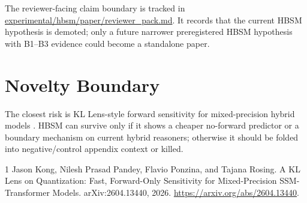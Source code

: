 \documentclass{article}
\begin{document}
The reviewer-facing claim boundary is tracked in
\url{experimental/hbsm/paper/reviewer_pack.md}. It records that the current HBSM hypothesis is demoted; only a future narrower preregistered HBSM hypothesis with B1--B3 evidence could become a standalone paper.

\section{Novelty Boundary}

The closest risk is KL Lens-style forward sensitivity for mixed-precision
hybrid models \cite{kllens}. HBSM can survive only if it shows a cheaper
no-forward predictor or a boundary mechanism on current hybrid reasoners;
otherwise it should be folded into negative/control appendix context or killed.

\begin{thebibliography}{1}
Jason Kong, Nilesh Prasad Pandey, Flavio Ponzina, and Tajana Rosing.
A KL Lens on Quantization: Fast, Forward-Only Sensitivity for
Mixed-Precision SSM-Transformer Models. arXiv:2604.13440, 2026.
\url{https://arxiv.org/abs/2604.13440}.
\end{thebibliography}
\end{document}
